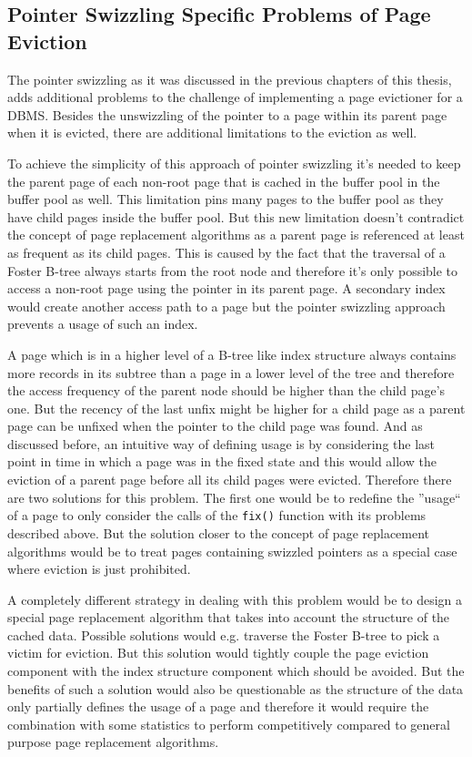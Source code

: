 \subsection[Pointer Swizzling Problems]{Pointer Swizzling Specific Problems of Page Eviction}

	The pointer swizzling as it was discussed in the previous chapters of this thesis, adds additional problems to the challenge of implementing a page evictioner for a DBMS. Besides the unswizzling of the pointer to a page within its parent page when it is evicted, there are additional limitations to the eviction as well.
	
	To achieve the simplicity of this approach of pointer swizzling it's needed to keep the parent page of each non-root page that is cached in the buffer pool in the buffer pool as well. This limitation pins many pages to the buffer pool as they have child pages inside the buffer pool. But this new limitation doesn't contradict the concept of page replacement algorithms as a parent page is referenced at least as frequent as its child pages. This is caused by the fact that the traversal of a Foster B-tree always starts from the root node and therefore it's only possible to access a non-root page using the pointer in its parent page. A secondary index would create another access path to a page but the pointer swizzling approach prevents a usage of such an index. 
	
	A page which is in a higher level of a B-tree like index structure always contains more records in its subtree than a page in a lower level of the tree and therefore the access frequency of the parent node should be higher than the child page's one. But the recency of the last unfix might be higher for a child page as a parent page can be unfixed when the pointer to the child page was found. And as discussed before, an intuitive way of defining usage is by considering the last point in time in which a page was in the fixed state and this would allow the eviction of a parent page before all its child pages were evicted. Therefore there are two solutions for this problem. The first one would be to redefine the ''usage`` of a page to only consider the calls of the \lstinline{fix()} function with its problems described above. But the solution closer to the concept of page replacement algorithms would be to treat pages containing swizzled pointers as a special case where eviction is just prohibited.
	
	A completely different strategy in dealing with this problem would be to design a special page replacement algorithm that takes into account the structure of the cached data. Possible solutions would e.g. traverse the Foster B-tree to pick a victim for eviction. But this solution would tightly couple the page eviction component with the index structure component which should be avoided. But the benefits of such a solution would also be questionable as the structure of the data only partially defines the usage of a page and therefore it would require the combination with some statistics to perform competitively compared to general purpose page replacement algorithms.
	
